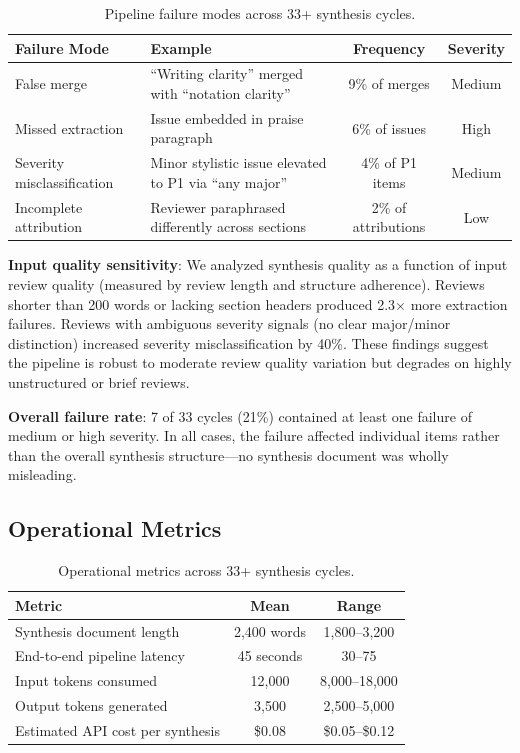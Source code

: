 \begin{table}[h]
\centering
\small
\begin{tabular}{llcc}
\toprule
Failure Mode & Example & Frequency & Severity \\
\midrule
False merge & ``Writing clarity'' merged with ``notation clarity'' & 9\% of merges & Medium \\
Missed extraction & Issue embedded in praise paragraph & 6\% of issues & High \\
Severity misclassification & Minor stylistic issue elevated to P1 via ``any major'' & 4\% of P1 items & Medium \\
Incomplete attribution & Reviewer paraphrased differently across sections & 2\% of attributions & Low \\
\bottomrule
\end{tabular}
\caption{Pipeline failure modes across 33+ synthesis cycles.}
\label{tab:failure-modes}
\end{table}

\textbf{Input quality sensitivity}: We analyzed synthesis quality as a function of input review quality (measured by review length and structure adherence). Reviews shorter than 200 words or lacking section headers produced 2.3$\times$ more extraction failures. Reviews with ambiguous severity signals (no clear major/minor distinction) increased severity misclassification by 40\%. These findings suggest the pipeline is robust to moderate review quality variation but degrades on highly unstructured or brief reviews.

\textbf{Overall failure rate}: 7 of 33 cycles (21\%) contained at least one failure of medium or high severity. In all cases, the failure affected individual items rather than the overall synthesis structure---no synthesis document was wholly misleading.

\subsection{Operational Metrics}

\begin{table}[h]
\centering
\small
\begin{tabular}{lcc}
\toprule
Metric & Mean & Range \\
\midrule
Synthesis document length & 2,400 words & 1,800--3,200 \\
End-to-end pipeline latency & 45 seconds & 30--75 \\
Input tokens consumed & 12,000 & 8,000--18,000 \\
Output tokens generated & 3,500 & 2,500--5,000 \\
Estimated API cost per synthesis & \$0.08 & \$0.05--\$0.12 \\
\bottomrule
\end{tabular}
\caption{Operational metrics across 33+ synthesis cycles.}
\label{tab:operational}
\end{table}
